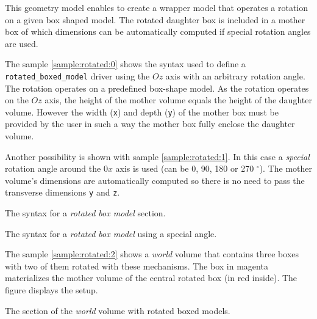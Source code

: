 This geometry model enables to  create a wrapper model that operates a
rotation  on a given  box shaped  model. The  rotated daughter  box is
included  in a  mother box  of which  dimensions can  be automatically
computed if special rotation angles are used.

The sample  \ref{sample:rotated:0} shows the  syntax used to  define a
\texttt{rotated\_boxed\_model}  driver  using the  $Oz$  axis with  an
arbitrary  rotation  angle.  The  rotation  operates  on a  predefined
box-shape model. As the rotation operates on the $Oz$ axis, the height
of the mother volume equals the height of the daughter volume. However
the width (\texttt{x})  and depth (\texttt{y}) of the  mother box must
be provided by the user in such a way the mother box fully enclose the 
daughter volume.

Another  possibility is shown  with sample  \ref{sample:rotated:1}. In
this case a \emph{special} rotation angle around the $0x$ axis is used
(can be  0, 90, 180 or  270 $^{\circ}$).  The  mother volume's dimensions
are automatically computed so there  is no need to pass the transverse
dimensions \texttt{y} and \texttt{z}.

\begin{sample}[h]
\caption{The syntax for a \emph{rotated box model} section.}
\label{sample:rotated:0}
\end{sample}

\begin{sample}[h]
\caption{The  syntax for a  \emph{rotated box  model} using  a special
  angle.}
\label{sample:rotated:1}
\end{sample}

The  sample \ref{sample:rotated:2}  shows a  \emph{world}  volume that
contains three boxes  with two of them rotated  with these mechanisms.
The  box in  magenta materializes  the  mother volume  of the  central
rotated box (in red inside). The figure \label{fig:setup_5:0} displays
the setup.

\begin{sample}[h]
\caption{The section of the \emph{world} volume with rotated boxed models.}
\label{sample:rotated:2}
\end{sample}

